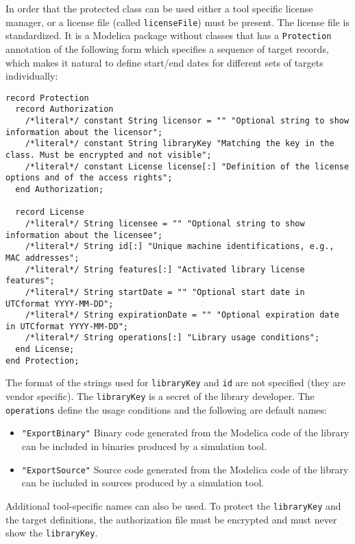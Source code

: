 In order that the protected class can be used either a tool specific license manager, or a license file (called \lstinline!licenseFile!) must be present.
The license file is standardized.
It is a Modelica package without classes that has a \lstinline!Protection! annotation of the following form which specifies a sequence of target records, which makes it natural to define start/end dates for different sets of targets individually:
\begin{lstlisting}[language=modelica]
record Protection
  record Authorization
    /*literal*/ constant String licensor = "" "Optional string to show information about the licensor";
    /*literal*/ constant String libraryKey "Matching the key in the class. Must be encrypted and not visible";
    /*literal*/ constant License license[:] "Definition of the license options and of the access rights";
  end Authorization;

  record License
    /*literal*/ String licensee = "" "Optional string to show information about the licensee";
    /*literal*/ String id[:] "Unique machine identifications, e.g., MAC addresses";
    /*literal*/ String features[:] "Activated library license features";
    /*literal*/ String startDate = "" "Optional start date in UTCformat YYYY-MM-DD";
    /*literal*/ String expirationDate = "" "Optional expiration date in UTCformat YYYY-MM-DD";
    /*literal*/ String operations[:] "Library usage conditions";
  end License;
end Protection;
\end{lstlisting}%

The format of the strings used for \lstinline!libraryKey! and \lstinline!id! are not specified (they are vendor specific).
The \lstinline!libraryKey! is a secret of the library developer.
The \lstinline!operations! define the usage conditions and the following are default names:
\begin{itemize}
\item
  \lstinline!"ExportBinary"! Binary code generated from the Modelica code of the library can be included in binaries produced by a simulation tool.
\item
  \lstinline!"ExportSource"! Source code generated from the Modelica code of the library can be included in sources produced by a simulation tool.
\end{itemize}

Additional tool-specific names can also be used.
To protect the \lstinline!libraryKey! and the target definitions, the authorization file must be encrypted and must never show the \lstinline!libraryKey!.

